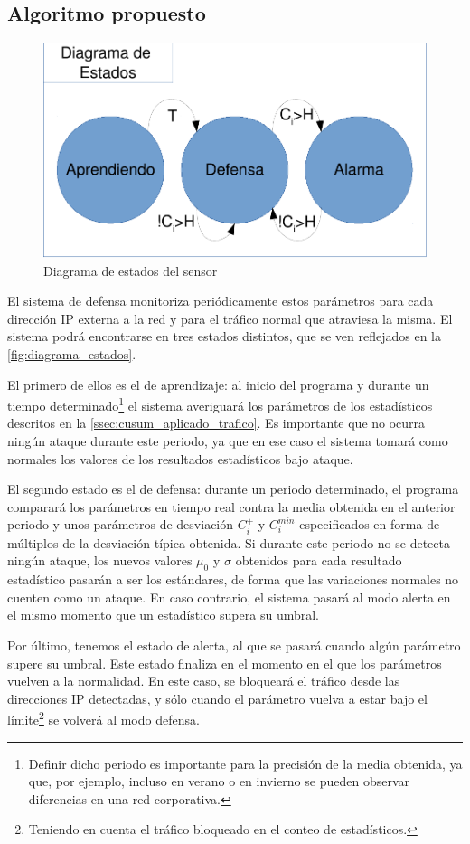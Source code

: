 \subsection{Algoritmo propuesto}
\begin{figure}[htbp]
\centering
\includegraphics[width=0.8\columnwidth]{CapituloCusum/Figuras/DiagramaEstados-crop}
\caption{Diagrama de estados del sensor}
\label{fig:diagrama_estados} 
\end{figure}

El sistema de defensa \redborderddos monitoriza periódicamente estos parámetros
para cada dirección IP externa a la red y para el tráfico normal que atraviesa
la misma. El sistema podrá encontrarse en tres estados distintos, que se ven reflejados
en la \autoref{fig:diagrama_estados}.

El primero de ellos es el de aprendizaje: al
inicio del programa y durante un tiempo determinado\footnote{Definir dicho
periodo es importante para la precisión de la media obtenida, ya que, por ejemplo, incluso en
verano o en invierno se pueden observar diferencias en una red corporativa.}
el sistema averiguará los parámetros de los estadísticos descritos en la 
\autoref{ssec:cusum_aplicado_trafico}. Es importante que no ocurra ningún
ataque durante este periodo, ya que en ese caso el sistema tomará como normales
los valores de los resultados estadísticos bajo ataque. %

El segundo estado es el de defensa: durante un periodo determinado, el programa comparará
los parámetros en tiempo real contra la media obtenida en el anterior periodo y
unos parámetros de desviación $C_i^+$ y $C_i^{min}$ especificados en forma de múltiplos
de la desviación típica obtenida. Si durante este periodo no se detecta ningún ataque, los nuevos
valores $\mu_0$ y $\sigma$ obtenidos para cada resultado estadístico pasarán a ser los estándares, de
forma que las variaciones normales no cuenten como un ataque. En caso contrario, el sistema pasará al modo alerta en el mismo
momento que un estadístico supera su umbral. %

Por último, tenemos el estado de alerta, al que se pasará cuando algún parámetro supere su umbral. Este estado finaliza en el
momento en el que los parámetros vuelven a la normalidad. En este caso, se bloqueará el tráfico desde
las direcciones IP detectadas, y sólo cuando el parámetro vuelva a estar bajo el límite\footnote{Teniendo
en cuenta el tráfico bloqueado en el conteo de estadísticos.} se volverá al modo defensa.

\endinput

